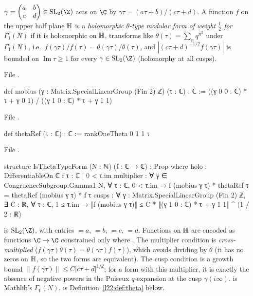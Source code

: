 \begin{definition}\label{l22:def:thetatype}
$\gamma=\begin{pmatrix}a&b\\c&d\end{pmatrix}\in\ltwotwoSL$ acts on $\C$ by $\gamma\tau = (a\tau+b)/(c\tau+d)$.
A function $f$ on the upper half plane $\mathbb{H}$ is a \emph{holomorphic $\theta$-type modular form of
weight $\tfrac12$ for $\Gamma_1(N)$} if it is holomorphic on $\mathbb{H}$, transforms like
$\theta(\tau)=\sum_n q^{n^2}$ under $\Gamma_1(N)$, i.e.\ $f(\gamma\tau)/f(\tau)=\theta(\gamma\tau)/\theta(\tau)$, and
$|(c\tau+d)^{-1/2}f(\gamma\tau)|$ is bounded on $\operatorname{Im}\tau\ge1$ for every $\gamma\in\ltwotwoSL$
(holomorphy at all cusps).
\end{definition}
\noindent File .
\begin{leancode}
def mobius (γ : Matrix.SpecialLinearGroup (Fin 2) ℤ) (τ : ℂ) : ℂ :=
  ((γ 0 0 : ℂ) * τ + γ 0 1) / ((γ 1 0 : ℂ) * τ + γ 1 1)
\end{leancode}
\noindent File .
\begin{leancode}
def thetaRef (τ : ℂ) : ℂ := rankOneTheta 0 1 1 τ
\end{leancode}
\noindent File .
\begin{leancode}
structure IsThetaTypeForm (N : ℕ) (f : ℂ → ℂ) : Prop where
  holo : DifferentiableOn ℂ f {τ : ℂ | 0 < τ.im}
  multiplier : ∀ γ ∈ CongruenceSubgroup.Gamma1 N, ∀ τ : ℂ, 0 < τ.im →
    f (mobius γ τ) * thetaRef τ = thetaRef (mobius γ τ) * f τ
  cusps : ∀ γ : Matrix.SpecialLinearGroup (Fin 2) ℤ, ∃ C : ℝ, ∀ τ : ℂ, 1 ≤ τ.im →
    ‖f (mobius γ τ)‖ ≤ C * ‖(γ 1 0 : ℂ) * τ + γ 1 1‖ ^ (1 / 2 : ℝ)
\end{leancode}

\begin{dictionary}
 is $\ltwotwoSL$, with entries $=a$, $=b$,
$=c$, $=d$. Functions on $\mathbb{H}$ are encoded as functions $\C\to\C$ constrained only
where . The multiplier condition is \emph{cross-multiplied} ($f(\gamma\tau)\theta(\tau) =
\theta(\gamma\tau)f(\tau)$), which avoids dividing by $\theta$ (it has no zeros on $\mathbb{H}$, so the two forms are
equivalent). The cusp condition is a growth bound $\|f(\gamma\tau)\|\le C|c\tau+d|^{1/2}$; for a form with
this multiplier, it is exactly the absence of negative powers in the Puiseux $q$-expansion at the cusp
$\gamma(i\infty)$.  is Mathlib's $\Gamma_1(N)$.  is
Definition~\ref{l22:def:theta} below.
\end{dictionary}

